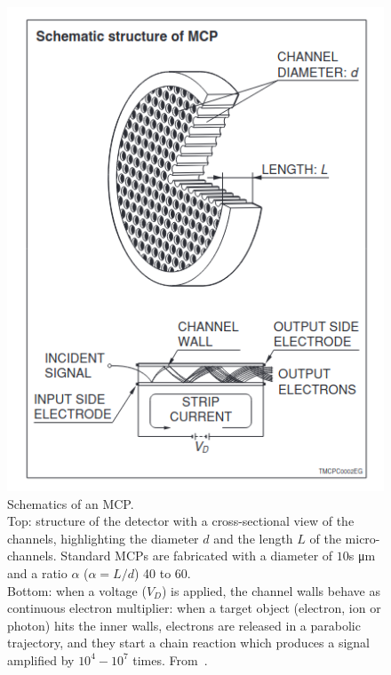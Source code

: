 \begin{figure}
\begin{minipage}[c]{.45\linewidth}
    \includegraphics[width=1\linewidth]{Images/TestBeam_setup/MCP diagram HAMAMATSU.png}
\end{minipage}
\hfill
\begin{minipage}[c]{.5\linewidth}
    \caption{
    Schematics of an MCP.\\ 
    Top: structure of the detector with a cross-sectional view of the channels, highlighting the diameter \(d\) and the length \(L\) of the micro-channels. Standard MCPs are fabricated with a diameter of \(10\)s \unit{\micro\meter} and a ratio \(\alpha\) (\(\alpha = L / d\)) 40 to 60.\\
    Bottom: when a voltage (\(V_D\)) is applied, the channel walls behave as continuous electron multiplier: when a target object (electron, ion or photon) hits the inner walls, electrons are released in a parabolic trajectory, and they start a chain reaction which produces a signal amplified by \(10^4-10^7\) times. From~\cite{MCP_figure}.}
\end{minipage}
\label{fig:MCP_diagrame}
\end{figure}


